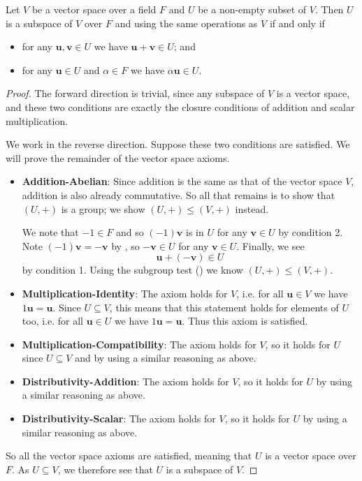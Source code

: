 \begin{theorem}\label{thrm-subspace-test}
    Let $V$ be a vector space over a field $F$ and $U$ be a non-empty subset of $V$. Then $U$ is a subspace of $V$ over $F$ and using the same operations as $V$ if and only if
    \begin{itemize}
        \item for any $\textbf{u}, \textbf{v} \in U$ we have $\textbf{u} + \textbf{v} \in U$; and
        \item for any $\textbf{u} \in U$ and $\alpha \in F$ we have $\alpha\textbf{u} \in U$.
    \end{itemize}
\end{theorem}
\begin{proof}
    The forward direction is trivial, since any subspace of $V$ is a vector space, and these two conditions are exactly the closure conditions of addition and scalar multiplication.

    We work in the reverse direction. Suppose these two conditions are satisfied. We will prove the remainder of the vector space axioms.
    \begin{itemize}
        \item \textbf{Addition-Abelian}: Since addition is the same as that of the vector space $V$, addition is also already commutative. So all that remains is to show that $(U, +)$ is a group; we show $(U, +) \leq (V, +)$ instead.
        
        We note that $-1 \in F$ and so $(-1)\textbf{v}$ is in $U$ for any $\textbf{v} \in U$ by condition 2. Note $(-1)\textbf{v} = -\textbf{v}$ by , so $-\textbf{v} \in U$ for any $\textbf{v} \in U$. Finally, we see
        \[
            \textbf{u} + (-\textbf{v}) \in U
        \]
        by condition 1. Using the subgroup test () we know $(U, +) \leq (V, +)$.
        
        \item \textbf{Multiplication-Identity}: The axiom holds for $V$, i.e. for all $\textbf{u} \in V$ we have $1\textbf{u} = \textbf{u}$. Since $U \subseteq V$, this means that this statement holds for elements of $U$ too, i.e. for all $\textbf{u} \in U$ we have $1\textbf{u} = \textbf{u}$. Thus this axiom is satisfied.
        
        \item \textbf{Multiplication-Compatibility}: The axiom holds for $V$, so it holds for $U$ since $U \subseteq V$ and by using a similar reasoning as above.
        
        \item \textbf{Distributivity-Addition}: The axiom holds for $V$, so it holds for $U$ by using a similar reasoning as above.
        
        \item \textbf{Distributivity-Scalar}: The axiom holds for $V$, so it holds for $U$ by using a similar reasoning as above.
    \end{itemize}
    So all the vector space axioms are satisfied, meaning that $U$ is a vector space over $F$. As $U \subseteq V$, we therefore see that $U$ is a subspace of $V$.
\end{proof}
